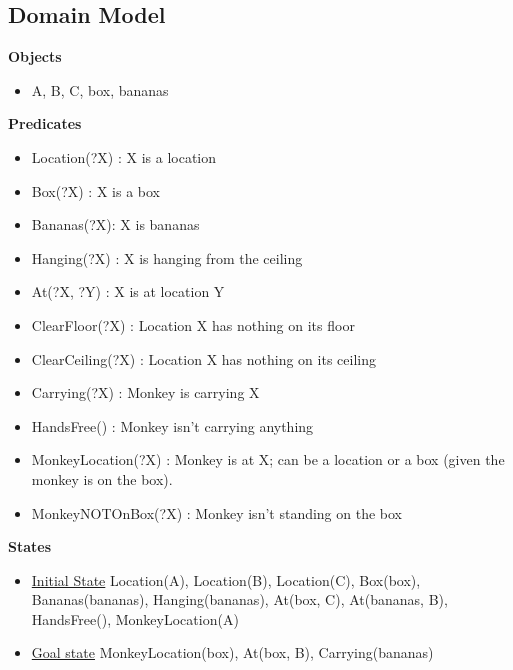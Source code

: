 \documentclass{article}
\begin{document}
\subsection*{Domain Model}
\textbf{Objects}
\begin{itemize}
    \item A, B, C, box, bananas
\end{itemize}

\textbf{Predicates}
\begin{itemize}
    \item Location(?X) : X is a location
    \item Box(?X) : X is a box
    \item Bananas(?X): X is bananas
    \item Hanging(?X) : X is hanging from the ceiling
    \item At(?X, ?Y) : X is at location Y
    \item ClearFloor(?X) : Location X has nothing on its floor
    \item ClearCeiling(?X) : Location X has nothing on its ceiling
    \item Carrying(?X) : Monkey is carrying X
    \item HandsFree() : Monkey isn't carrying anything
    \item MonkeyLocation(?X) : Monkey is at X; can be a location or a box (given the monkey is on the box).
    \item MonkeyNOTOnBox(?X) : Monkey isn't standing on the box
\end{itemize}
\textbf{States}
\begin{itemize}
    \item \underline{Initial State} Location(A), Location(B), Location(C),
        Box(box), Bananas(bananas), Hanging(bananas), At(box, C), At(bananas, B), HandsFree(), MonkeyLocation(A)
    \item \underline{Goal state} MonkeyLocation(box), At(box, B), Carrying(bananas)
\end{itemize}
\end{document}
